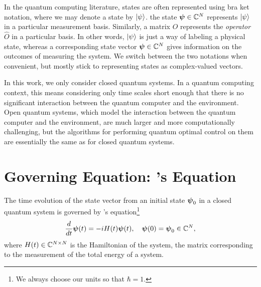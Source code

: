 \documentclass[letterpaper]{tufte-handout}
\begin{document}
In the quantum computing literature, states are often represented using bra ket notation, where we may denote a state by $|\psi\rangle$. 
the state $\boldsymbol{\psi} \in \mathbb{C}^N$ represents $|\psi\rangle$ in a particular measurement basis. Similarly, a matrix $O$ represents the \emph{operator} $\hat{O}$ in a particular basis. In other words, $|\psi\rangle$ is just a way of labeling a physical state, whereas a corresponding state vector $\boldsymbol{\psi} \in \mathbb{C}^N$ gives information on the outcomes of measuring the system. We switch between the two notations when convenient, but mostly stick to representing states as complex-valued vectors.

In this work, we only consider closed quantum systems. In a quantum computing context, this means considering only time scales short enough that there is no significant interaction between the quantum computer and the environment. Open quantum systems, which model the interaction between the quantum computer and the environment, are much larger and more computationally challenging, but the algorithms for performing quantum optimal control on them are essentially the same as for closed quantum systems.

\section{Governing Equation: \Schrodinger's Equation}

The time evolution of the state vector from an initial state $\boldsymbol{\psi}_0$ in a closed quantum system is governed by \Schrodinger's equation\footnote{We always choose our units so that $\hbar=1$.}
\begin{equation} \label{eq:schrodinger}
    \frac{d}{dt}\boldsymbol{\psi}(t) = -iH(t)\boldsymbol{\psi}(t),\quad \boldsymbol{\psi}(0) = \boldsymbol{\psi}_0 \in \mathbb{C}^N,
\end{equation}
where $H(t) \in \mathbb{C}^{N \times N}$ is the Hamiltonian of the system, the matrix corresponding to the measurement of the total energy of a system.
\end{document}
